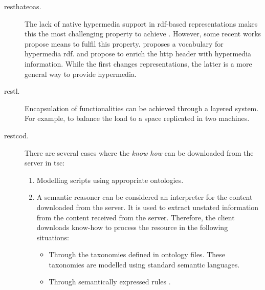 \begin{description}
	\item[\ac{resthateoas}.] The lack of native hypermedia support in \ac{rdf}-based representations makes this the most challenging property to achieve \citep{page_rest_2011}. %
				  However, some recent works propose means to fulfil this property.
				  \citet{kjernsmo_necessity_2012} proposes a vocabulary for hypermedia \ac{rdf}.
				  \citet{steiner_fulfilling_2011} and \citet{verborgh_functional_2012} propose to enrich the \ac{http} header with hypermedia information.
				  While the first changes representations, the latter is a more general way to provide hypermedia.
 \item[\ac{restl}.] Encapsulation of functionalities can be achieved through a layered system.
                     For example, to balance the load to a space replicated in two machines.
 \item[\ac{restcod}.] There are several cases where the \emph{know how} can be downloaded from the server in \ac{tsc}: %
            \begin{enumerate}
	      \item Modelling scripts using appropriate ontologies. %
	      \item A semantic reasoner can be considered an interpreter for the content downloaded from the server.
	            It is used to extract unstated information from the content received from the server.
	            Therefore, the client downloads know-how to process the resource in the following situations:
		    \begin{itemize}
		      \item Through the taxonomies defined in ontology files. %
		            These taxonomies are modelled using standard semantic languages. %
		      \item Through semantically expressed rules \citep{berners-lee_n3logic:_2008}. %
		    \end{itemize}
            \end{enumerate}
\end{description}


